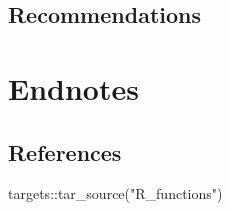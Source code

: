 \documentclass[
  letterpaper,
  DIV=11,
  numbers=noendperiod,
  oneside]{scrreprt}
\newenvironment{Shaded}{\begin{snugshade}}{\end{snugshade}}
\newcommand{\FunctionTok}[1]{\textcolor[rgb]{0.28,0.35,0.67}{#1}}
\newcommand{\NormalTok}[1]{\textcolor[rgb]{0.00,0.23,0.31}{#1}}
\newcommand{\SpecialCharTok}[1]{\textcolor[rgb]{0.37,0.37,0.37}{#1}}
\newcommand{\StringTok}[1]{\textcolor[rgb]{0.13,0.47,0.30}{#1}}
\begin{document}
\hypertarget{sec-recommendations}{%
\chapter{Recommendations}\label{sec-recommendations}}

\part{Endnotes}

\hypertarget{references}{%
\chapter{References}\label{references}}

\begin{Shaded}
\begin{Highlighting}[]
\NormalTok{targets}\SpecialCharTok{::}\FunctionTok{tar\_source}\NormalTok{(}\StringTok{"R\_functions"}\NormalTok{)}
\end{Highlighting}
\end{Shaded}
\end{document}

